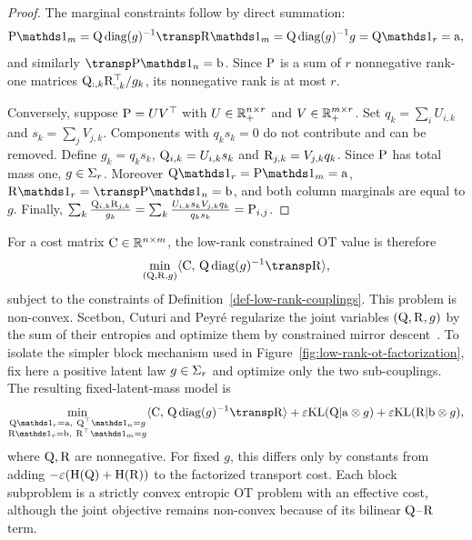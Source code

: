 \begin{proof}
	The marginal constraints follow by direct summation:
	\[
		\P\ones_m=\Q\diag(g)^{-1}\transp \R\ones_m
		=\Q\diag(g)^{-1}g=\Q\ones_r=\a,
	\]
	and similarly $\transp \P\ones_n=\b$. Since $\P$ is a sum of $r$ nonnegative rank-one matrices $\Q_{:,k}\R_{:,k}^\top/g_k$, its nonnegative rank is at most $r$.

	Conversely, suppose $\P=UV^\top$ with $U\in\RR_+^{n\times r}$ and $V\in\RR_+^{m\times r}$. Set $q_k=\sum_i U_{i,k}$ and $s_k=\sum_j V_{j,k}$. Components with $q_ks_k=0$ do not contribute and can be removed. Define $g_k=q_ks_k$, $\Q_{i,k}=U_{i,k}s_k$ and $\R_{j,k}=V_{j,k}q_k$. Since $\P$ has total mass one, $g\in\simplex_r$. Moreover $\Q\ones_r=\P\ones_m=\a$, $\R\ones_r=\transp \P\ones_n=\b$, and both column marginals are equal to $g$. Finally,
	$\sum_k\frac{\Q_{i,k}\R_{j,k}}{g_k} = \sum_k\frac{U_{i,k}s_kV_{j,k}q_k}{q_ks_k} =\P_{i,j}$.
\end{proof}

For a cost matrix $\C\in\RR^{n\times m}$, the low-rank constrained OT value is therefore
\[
	\min_{(\Q,\R,g)} \dotp{\C}{\Q\diag(g)^{-1}\transp \R},
\]
subject to the constraints of Definition~\ref{def-low-rank-couplings}.
This problem is non-convex. Scetbon, Cuturi and Peyr\'e regularize the joint variables $(\Q,\R,g)$ by the sum of their entropies and optimize them by constrained mirror descent~\cite{scetbon2021lowrank}. To isolate the simpler block mechanism used in Figure~\ref{fig:low-rank-ot-factorization}, fix here a positive latent law $g\in\simplex_r$ and optimize only the two sub-couplings. The resulting fixed-latent-mass model is
\begin{equation}\label{eq-low-rank-entropic-ot}
	\min_{\substack{\Q\ones_r=\a,\ \Q^\top\ones_n=g\\
	\R\ones_r=\b,\ \R^\top\ones_m=g}}
	\dotp{\C}{\Q\diag(g)^{-1}\transp \R}
	+
	\epsilon\KLD(\Q|\a\otimes g)
	+
	\epsilon\KLD(\R|\b\otimes g),
\end{equation}
where $\Q,\R$ are nonnegative. For fixed $g$, this differs only by constants from adding $-\epsilon(\HD(\Q)+\HD(\R))$ to the factorized transport cost. Each block subproblem is a strictly convex entropic OT problem with an effective cost, although the joint objective remains non-convex because of its bilinear $\Q$--$\R$ term.

